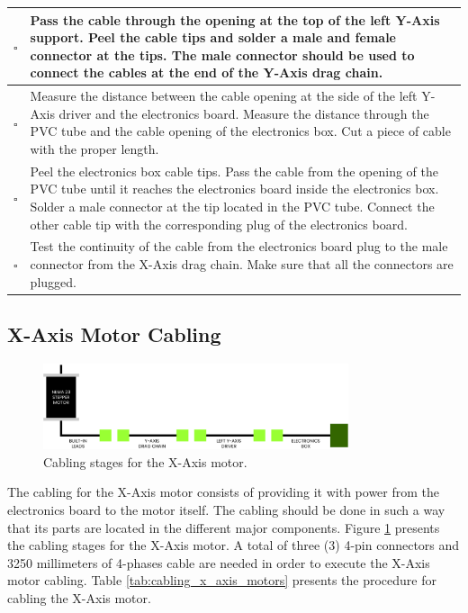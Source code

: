\documentclass{article}
\begin{document}
\begin{singlespace}
\begin{xltabular}{\textwidth}{|c|X|}
    $\square$ & Pass the cable through the opening at the top of the left Y-Axis support. Peel the cable tips and solder a male and female connector at the tips. The male connector should be used to connect the cables at the end of the Y-Axis drag chain. \\ \hline
    $\square$ & Measure the distance between the cable opening at the side of the left Y-Axis driver and the electronics board. Measure the distance through the PVC tube and the cable opening of the electronics box. Cut a piece of cable with the proper length. \\ \hline
    $\square$ & Peel the  electronics box cable tips. Pass the cable from the opening of the PVC tube until it reaches the electronics board inside the electronics box. Solder a male connector at the tip located in the PVC tube. Connect the other cable tip with the corresponding plug of the electronics board. \\ \hline
    $\square$ & Test the continuity of the cable from the electronics board plug to the male connector from the X-Axis drag chain. Make sure that all the connectors are plugged. \\ \hline 
\end{xltabular}
\end{singlespace}

\subsection{X-Axis Motor Cabling}
\begin{figure}[H]
    \centering
    \includegraphics[width=0.8\textwidth]{images/cabling/x_axis_motors_cabling.pdf}
    \caption{Cabling stages for the X-Axis motor.}
    \label{fig:cabling_x_axis_motors}
\end{figure}
The cabling for the X-Axis motor consists of providing it with power from the electronics board to the motor itself. The cabling should be done in such a way that its parts are located in the different major components. Figure \ref{fig:cabling_x_axis_motors} presents the cabling stages for the X-Axis motor. A total of three (3) 4-pin connectors and 3250 millimeters of 4-phases cable are needed in order to execute the X-Axis motor cabling. Table \ref{tab:cabling_x_axis_motors} presents the procedure for cabling the X-Axis motor.
\end{document}

